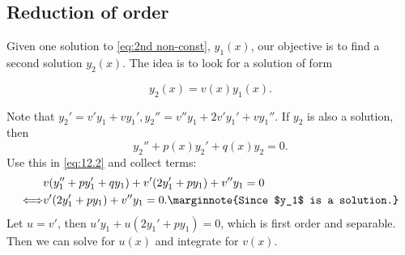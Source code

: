 \documentclass[10pt]{article}
\begin{document}
    \subsection{Reduction of order}
    Given one solution to \ref{eq:2nd non-const}, $y_1(x)$, our objective is to find a second solution $y_2(x)$. The idea is to look for a solution of form

    \begin{equation}\label{eq:12.2}
        y_2(x)=v(x)y_1(x).
    \end{equation}

    Note that $ y_2'=v'y_1+vy_1', y_2''=v''y_1+2v'y_1'+vy_1'' $. If $y_2$ is also a solution, then 
    \[
        y_2''+p(x)y_2'+q(x)y_2=0
    .\]
    Use this in \ref{eq:12.2} and collect terms:
    \[
        \begin{aligned}
             &v(y_1''+py_1'+qy_1)+v'(2y_1'+py_1)+v''y_1=0\\
             \Longleftrightarrow &v'(2y_1'+py_1)+v''y_1=0.\marginnote{Since $y_1$ is a solution.}
        \end{aligned}
    \]
    Let $u=v'$, then $u'y_1+u(2y_1'+py_1)=0$, which is first order and separable. Then we can solve for $u(x)$ and integrate for $v(x)$.
\end{document}
